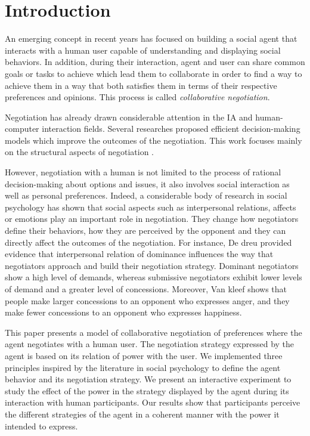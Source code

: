 \documentclass[runningheads,a4paper]{llncs}
\begin{document}
	
	\section{Introduction}
	An emerging concept in recent years has focused on building a social agent that interacts with a human user capable of understanding and displaying social behaviors. In addition, during their interaction, agent and user can share common goals or tasks to achieve which lead them to collaborate in order to find a way to achieve them in a way that both satisfies them in terms of their respective preferences and opinions. This process is called \emph{collaborative negotiation}.
	
	Negotiation has already drawn considerable attention in the IA and human-computer interaction fields. Several researches proposed efficient decision-making models which improve the outcomes of the negotiation. This work focuses mainly on the structural aspects of negotiation \cite{sycara2010agent,lai2009generic}. 
	
	However, negotiation with a human is not limited to the process of rational decision-making about options and issues, it also involves social interaction as well as personal preferences. Indeed, a considerable body of research in social psychology has shown that social aspects such as interpersonal relations, affects or emotions play an important role in negotiation. They change how negotiators define their behaviors, how they are perceived by the opponent and they can directly affect the outcomes of the negotiation.
	For instance, De dreu\cite{de1995impact} provided evidence that interpersonal relation of dominance influences the way that negotiators approach and build their negotiation strategy. Dominant negotiators show a high level of demands, whereas submissive negotiators exhibit lower levels of demand and a greater level of concessions. Moreover, Van kleef \cite{van2006power} shows that people make larger concessions to an opponent who expresses anger, and they make fewer concessions to an opponent who expresses happiness.

	This paper presents a model of collaborative negotiation of preferences where the agent negotiates with a human user. The negotiation strategy expressed by the agent is based on its relation of power with the user. We implemented three principles inspired by the literature in social psychology to define the agent behavior and its negotiation strategy. We present an interactive experiment to study the effect of the power in the strategy displayed by the agent during its interaction with human participants. Our results show that participants perceive the different strategies of the agent in a coherent manner with the power it intended to express. 
	
\end{document}
